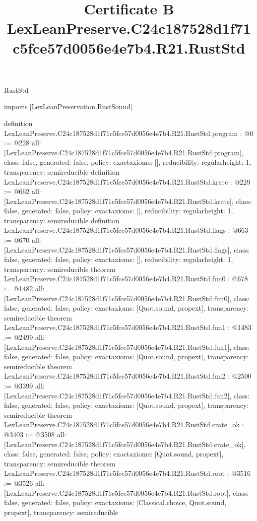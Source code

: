 \begin{lexlean}{RustStd}
\title{Certificate B LexLeanPreserve.C24c187528d1f71c5fce57d0056e4e7b4.R21.RustStd}
\begin{coremodule}
imports [LexLeanPreservation.RustSound]

definition LexLeanPreserve.C24c187528d1f71c5fce57d0056e4e7b4.R21.RustStd.program : @0 := @228 {
  all: [LexLeanPreserve.C24c187528d1f71c5fce57d0056e4e7b4.R21.RustStd.program],
  class: false,
  generated: false,
  policy: exact{axioms: []},
  reducibility: regular{height: 1},
  transparency: semireducible
}
definition LexLeanPreserve.C24c187528d1f71c5fce57d0056e4e7b4.R21.RustStd.krate : @229 := @662 {
  all: [LexLeanPreserve.C24c187528d1f71c5fce57d0056e4e7b4.R21.RustStd.krate],
  class: false,
  generated: false,
  policy: exact{axioms: []},
  reducibility: regular{height: 1},
  transparency: semireducible
}
definition LexLeanPreserve.C24c187528d1f71c5fce57d0056e4e7b4.R21.RustStd.flags : @663 := @670 {
  all: [LexLeanPreserve.C24c187528d1f71c5fce57d0056e4e7b4.R21.RustStd.flags],
  class: false,
  generated: false,
  policy: exact{axioms: []},
  reducibility: regular{height: 1},
  transparency: semireducible
}
theorem LexLeanPreserve.C24c187528d1f71c5fce57d0056e4e7b4.R21.RustStd.fun0 : @678 := @1482 {
  all: [LexLeanPreserve.C24c187528d1f71c5fce57d0056e4e7b4.R21.RustStd.fun0],
  class: false,
  generated: false,
  policy: exact{axioms: [Quot.sound, propext]},
  transparency: semireducible
}
theorem LexLeanPreserve.C24c187528d1f71c5fce57d0056e4e7b4.R21.RustStd.fun1 : @1483 := @2499 {
  all: [LexLeanPreserve.C24c187528d1f71c5fce57d0056e4e7b4.R21.RustStd.fun1],
  class: false,
  generated: false,
  policy: exact{axioms: [Quot.sound, propext]},
  transparency: semireducible
}
theorem LexLeanPreserve.C24c187528d1f71c5fce57d0056e4e7b4.R21.RustStd.fun2 : @2500 := @3399 {
  all: [LexLeanPreserve.C24c187528d1f71c5fce57d0056e4e7b4.R21.RustStd.fun2],
  class: false,
  generated: false,
  policy: exact{axioms: [Quot.sound, propext]},
  transparency: semireducible
}
theorem LexLeanPreserve.C24c187528d1f71c5fce57d0056e4e7b4.R21.RustStd.crate_ok : @3403 := @3508 {
  all: [LexLeanPreserve.C24c187528d1f71c5fce57d0056e4e7b4.R21.RustStd.crate_ok],
  class: false,
  generated: false,
  policy: exact{axioms: [Quot.sound, propext]},
  transparency: semireducible
}
theorem LexLeanPreserve.C24c187528d1f71c5fce57d0056e4e7b4.R21.RustStd.root : @3516 := @3526 {
  all: [LexLeanPreserve.C24c187528d1f71c5fce57d0056e4e7b4.R21.RustStd.root],
  class: false,
  generated: false,
  policy: exact{axioms: [Classical.choice, Quot.sound, propext]},
  transparency: semireducible
}


\end{coremodule}
\end{lexlean}
